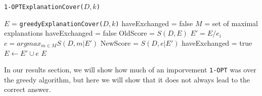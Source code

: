 \begin{algorithm}
  \caption{ \texttt{1-OPTExplanationCover($D,k$)} }
  \label{alg:1-OPT}
  \begin{algorithmic}
    \State $E$ =  \texttt{greedyExplanationCover($D,k$)}
    \State haveExchanged = false
    \State $M$ = set of maximal explanations
    \Repeat
    \State haveExchanged = false
    \State OldScore = $S(D,E)$
    \State $E' = E / e_i$
    \State $e = argmax_{m \in M} S(D,m|E')$
    \State NewScore = $S(D,e|E')$
    \State haveExchanged = true
    \State $E \leftarrow E' \cup e$
    \EndIf
    \EndFor
    \State \Return $E$
  \end{algorithmic}
\end{algorithm}

In our results section, we will show how much of an imporvement \texttt{1-OPT} was over the greedy algorithm, but here we will show that it does not always lead to the correct answer.

